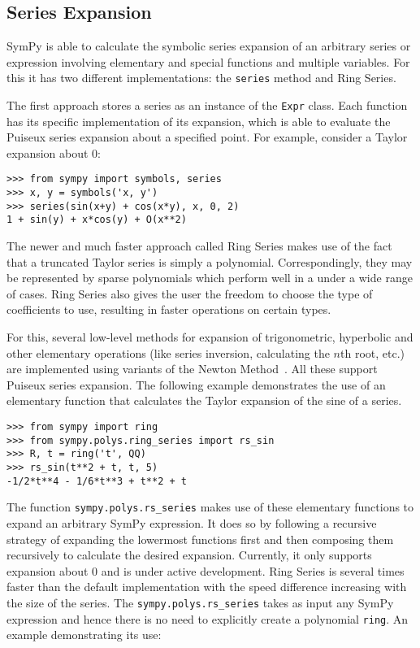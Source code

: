 \subsection{Series Expansion}

SymPy is able to calculate the symbolic series expansion of an arbitrary series
or expression involving elementary and special functions and multiple
variables. For this it has two different implementations: the \texttt{series}
method and Ring Series.

The first approach stores a series as an instance of the \texttt{Expr} class.
Each function has its specific implementation of its expansion, which is able to
evaluate the Puiseux series expansion about a specified point. For example,
consider a Taylor expansion about 0:

\begin{verbatim}
>>> from sympy import symbols, series
>>> x, y = symbols('x, y')
>>> series(sin(x+y) + cos(x*y), x, 0, 2)
1 + sin(y) + x*cos(y) + O(x**2)
\end{verbatim}

The newer and much faster approach called Ring Series makes use of the
fact that a truncated Taylor series is simply a polynomial. Correspondingly, they
may be represented by sparse polynomials which perform
well in a under a wide range of cases. Ring Series also gives
the user the freedom to choose the type of coefficients to use, resulting in
faster operations on certain types.

For this, several low-level methods for expansion of trigonometric, hyperbolic
and other elementary operations (like series inversion, calculating the $n$th
root, etc.) are implemented using variants of the Newton Method~\cite{zimmerman}.
All these support Puiseux series expansion. The following example demonstrates
the use of an elementary function that calculates the Taylor expansion of the
sine of a series.

\begin{verbatim}
>>> from sympy import ring
>>> from sympy.polys.ring_series import rs_sin
>>> R, t = ring('t', QQ)
>>> rs_sin(t**2 + t, t, 5)
-1/2*t**4 - 1/6*t**3 + t**2 + t
\end{verbatim}

The function \texttt{sympy.polys.rs\_series} makes use of these elementary
functions to expand an arbitrary SymPy expression. It does so by following a
recursive strategy of expanding the lowermost functions first and then
composing them recursively to calculate the desired expansion. Currently, it
only supports expansion about 0 and is under active development. Ring Series
is several times faster than the default implementation with the speed
difference increasing with the size of the series. The
\texttt{sympy.polys.rs\_series} takes as input any SymPy expression and hence
there is no need to explicitly create a polynomial \texttt{ring}. An example
demonstrating its use:

